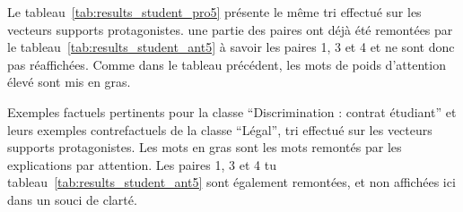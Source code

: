 Le tableau~\ref{tab:results_student_pro5} présente le même tri effectué sur les vecteurs supports protagonistes. une partie des paires ont déjà été remontées par le tableau~\ref{tab:results_student_ant5} à savoir les paires 1, 3 et 4 et ne sont donc pas réaffichées. Comme dans le tableau précédent, les mots de poids d'attention élevé sont mis en gras.

\begin{table}
    \caption{Exemples factuels pertinents pour la classe ``Discrimination : contrat étudiant'' et leurs exemples contrefactuels de la classe ``Légal'', tri effectué sur les vecteurs supports protagonistes. Les mots en gras sont les mots remontés par les explications par attention. Les paires 1, 3 et 4 tu tableau~\ref{tab:results_student_ant5} sont également remontées, et non affichées ici dans un souci de clarté.} \label{tab:results_student_pro5}


\end{table}
